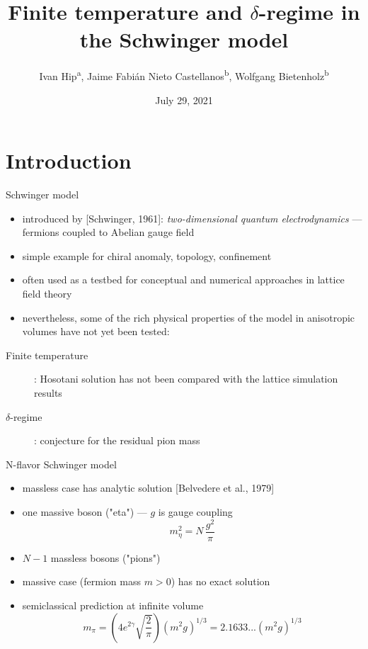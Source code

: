 \documentclass[english]{beamer}
\title{Finite temperature and $\delta$-regime in the Schwinger model}
\author{
  Ivan Hip\textsuperscript{a},
  Jaime Fabián Nieto Castellanos\textsuperscript{b},
  Wolfgang Bietenholz\textsuperscript{b}}
\institute{
  \textsuperscript{a}University of Zagreb, Croatia\\
  \textsuperscript{b}UNAM, Mexico
}
\date{July 29, 2021}
\begin{document}
 
\begin{frame}
  \titlepage
\end{frame}


\section{Introduction}

\begin{frame}{Schwinger model}
  \begin{itemize}
    \item introduced by [Schwinger, 1961]:
      \textit{two-dimensional quantum electrodynamics}
      --- fermions coupled to Abelian gauge field 
    \item simple example for chiral anomaly, topology, confinement
    \item often used as a testbed for conceptual and numerical
      approaches in lattice field theory
    \item nevertheless, some of the rich physical properties of
      the model in anisotropic volumes have not yet been tested:
  \end{itemize}
  \begin{description}
    \item[Finite temperature]:
      Hosotani solution has not been compared with the lattice
      simulation results
    \item[$\delta$-regime]: conjecture for the residual pion mass
  \end{description}
\end{frame}

\begin{frame}{N-flavor Schwinger model}
  \begin{itemize}
    \item massless case has analytic solution
      [Belvedere et al., 1979]
    \item one massive boson ("eta") --- $g$ is gauge coupling
      \[
        m_\eta^2 = N\,\frac{g^2}{\pi}
      \]
    \item $N - 1$ massless bosons ("pions")
    \item massive case (fermion mass $m > 0$) has no exact solution
    \item semiclassical prediction at infinite volume
      \[
        m_\pi = \left(4e^{2\gamma}\sqrt{\frac{2}{\pi}}\right)
          (m^2 g)^{1/3} = 2.1633...(m^2 g)^{1/3}
      \]        
  \end{itemize}
\end{frame}
\end{document}
